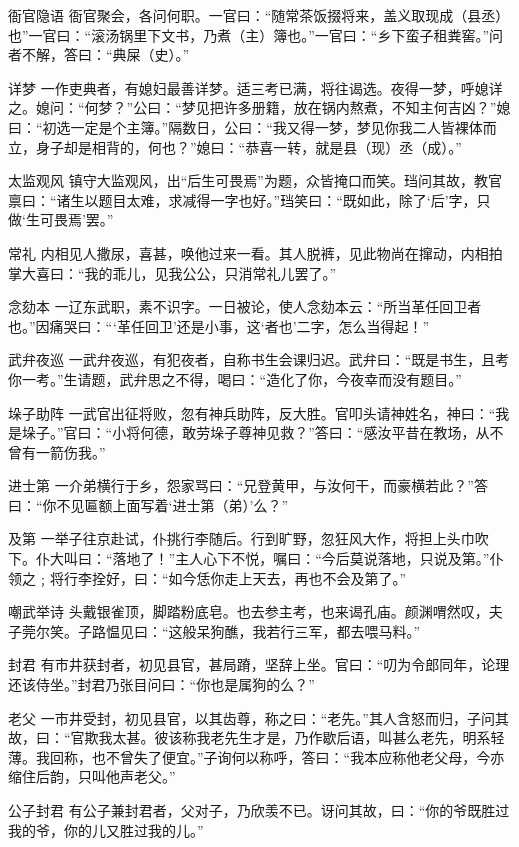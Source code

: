 \documentclass[12pt,UTF8]{ctexbook}
\begin{document}
衙官隐语
衙官聚会，各问何职。一官曰：“随常茶饭掇将来，盖义取现成（县丞）也”一官曰：“滚汤锅里下文书，乃煮（主）簿也。”一官曰：“乡下蛮子租粪窖。”问者不解，答曰：“典屎（史）。”

详梦
一作吏典者，有媳妇最善详梦。适三考已满，将往谒选。夜得一梦，呼媳详之。媳问：“何梦？”公曰：“梦见把许多册籍，放在锅内熬煮，不知主何吉凶？”媳曰：“初选一定是个主簿。”隔数日，公曰：“我又得一梦，梦见你我二人皆裸体而立，身子却是相背的，何也？”媳曰：“恭喜一转，就是县（现）丞（成）。”

太监观风
镇守大监观风，出“后生可畏焉”为题，众皆掩口而笑。珰问其故，教官禀曰：“诸生以题目太难，求减得一字也好。”珰笑曰：“既如此，除了‘后’字，只做‘生可畏焉’罢。”

常礼
内相见人撒尿，喜甚，唤他过来一看。其人脱裤，见此物尚在撺动，内相拍掌大喜曰：“我的乖儿，见我公公，只消常礼儿罢了。”

念劾本
一辽东武职，素不识字。一日被论，使人念劾本云：“所当革任回卫者也。”因痛哭曰：“‘革任回卫’还是小事，这‘者也’二字，怎么当得起！”

武弁夜巡
一武弁夜巡，有犯夜者，自称书生会课归迟。武弁曰：“既是书生，且考你一考。”生请题，武弁思之不得，喝曰：“造化了你，今夜幸而没有题目。”

垛子助阵
一武官出征将败，忽有神兵助阵，反大胜。官叩头请神姓名，神曰：“我是垛子。”官曰：“小将何德，敢劳垛子尊神见救？”答曰：“感汝平昔在教场，从不曾有一箭伤我。”

进士第
一介弟横行于乡，怨家骂曰：“兄登黄甲，与汝何干，而豪横若此？”答曰：“你不见匾额上面写着‘进士第（弟）’么？”

及第
一举子往京赴试，仆挑行李随后。行到旷野，忽狂风大作，将担上头巾吹下。仆大叫曰：“落地了！”主人心下不悦，嘱曰：“今后莫说落地，只说及第。”仆领之﹔将行李拴好，曰：“如今恁你走上天去，再也不会及第了。”

嘲武举诗
头戴银雀顶，脚踏粉底皂。也去参主考，也来谒孔庙。颜渊喟然叹，夫子莞尔笑。子路愠见曰：“这般呆狗醮，我若行三军，都去喂马料。”

封君
有市井获封者，初见县官，甚局蹐，坚辞上坐。官曰：“叨为令郎同年，论理还该侍坐。”封君乃张目问曰：“你也是属狗的么？”

老父
一市井受封，初见县官，以其齿尊，称之曰：“老先。”其人含怒而归，子问其故，曰：“官欺我太甚。彼该称我老先生才是，乃作歇后语，叫甚么老先，明系轻薄。我回称，也不曾失了便宜。”子询何以称呼，答曰：“我本应称他老父母，今亦缩住后韵，只叫他声老父。”

公子封君
有公子兼封君者，父对子，乃欣羡不已。讶问其故，曰：“你的爷既胜过我的爷，你的儿又胜过我的儿。”
\end{document}
